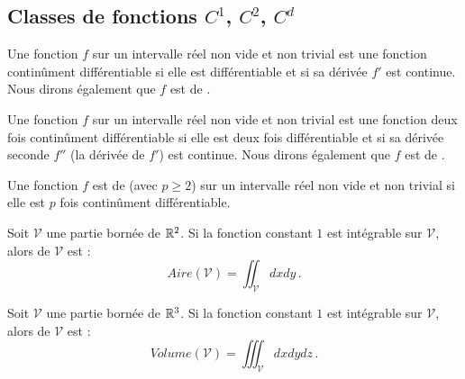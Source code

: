 \subsection{Classes de fonctions $C^1$, $C^2$, $C^d$}
%
\begin{definition}{}
  Une fonction $f$ sur un intervalle réel non vide et non trivial est une fonction continûment différentiable si elle est différentiable et si sa dérivée $f'$ est continue. Nous dirons également que $f$ est de .
\end{definition}
%
\begin{definition}{}
  Une fonction $f$ sur un intervalle réel non vide et non trivial est une fonction deux fois continûment différentiable si elle est deux fois différentiable et si sa dérivée seconde $f''$ (la dérivée de $f'$) est continue. Nous dirons également que $f$ est de .
\end{definition}
%
\begin{definition}{}
  Une fonction $f$ est de  (avec $p \ge 2$) sur un intervalle réel non vide et non trivial si elle est $p$ fois continûment différentiable.
\end{definition}
%
%
\begin{definition}{}
  Soit $\mathcal{V}$ une partie bornée de $\mathbb{R}^2$. Si la fonction constant $1$ est intégrable sur $\mathcal{V}$, alors  de $\mathcal{V}$ est :
  \begin{equation}
    \label{eq:aire}
    Aire(\mathcal{V}) = \iint_{\mathcal{V}} dxdy \,.
  \end{equation}
\end{definition}
%
\begin{definition}{}
  Soit $\mathcal{V}$ une partie bornée de $\mathbb{R}^3$. Si la fonction constant $1$ est intégrable sur $\mathcal{V}$, alors  de $\mathcal{V}$ est :
  \begin{equation}
    \label{eq:volume}
    Volume(\mathcal{V}) = \iiint_{\mathcal{V}} dxdydz \,.
  \end{equation}
\end{definition}


